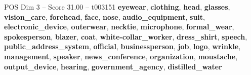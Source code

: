 \begin{textsample}{POS Dim 3 – Score 31.00 – t003151}  \label{ex:f3_pos_020}
\textbf{eyewear}, \textbf{clothing}, \textbf{head}, \textbf{glasses}, \textbf{vision\_care}, \textbf{forehead}, \textbf{face}, \textbf{nose}, \textbf{audio\_equipment}, \textbf{suit}, \textbf{electronic\_device}, \textbf{outerwear}, \textbf{necktie}, \textbf{microphone}, \textbf{formal\_wear}, \textbf{spokesperson}, \textbf{blazer}, \textbf{coat}, \textbf{white-collar\_worker}, \textbf{dress\_shirt}, \textbf{speech}, \textbf{public\_address\_system}, \textbf{official}, \textbf{businessperson}, \textbf{job}, \textbf{logo}, \textbf{wrinkle}, \textbf{management}, \textbf{speaker}, \textbf{news\_conference}, \textbf{organization}, \textbf{moustache}, \textbf{output\_device}, \textbf{hearing}, \textbf{government\_agency}, \textbf{distilled\_water}

\end{textsample}
